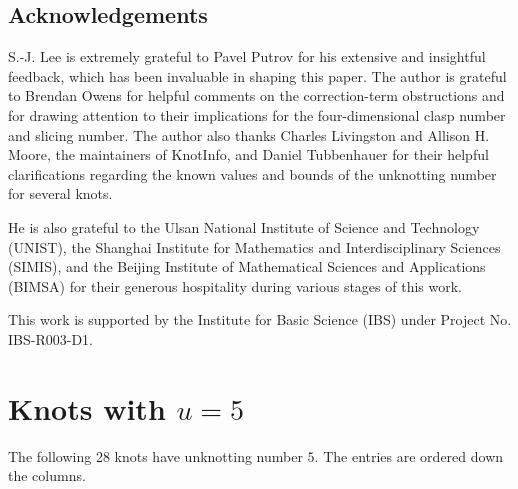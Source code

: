 \documentclass[12pt, oneside]{amsart}
\newcommand{\nUfive}{28}
\begin{document}
\subsection*{Acknowledgements}

S.-J. Lee is extremely grateful to Pavel Putrov for his extensive and insightful feedback, which has been invaluable in shaping this paper.
The author is grateful to Brendan Owens for helpful comments on the correction-term
obstructions and for drawing attention to their implications for the four-dimensional
clasp number and slicing number.
The author also thanks Charles Livingston and Allison H. Moore, the maintainers of KnotInfo, and Daniel Tubbenhauer for their helpful clarifications regarding the known values and bounds of the unknotting number for several knots.

He is also grateful to the Ulsan National Institute of Science and Technology (UNIST), the Shanghai Institute for Mathematics and Interdisciplinary Sciences (SIMIS), and the Beijing Institute of Mathematical Sciences and Applications (BIMSA) for their generous hospitality during various stages of this work. 

This work is supported by the Institute for Basic Science (IBS) under Project No. IBS-R003-D1.


\clearpage
\flushbottom
\appendix

\newsavebox{\appendixLegendBox}

\section{Knots with \texorpdfstring{$u=5$}{u=5}}\label{app:u5}
The following \nUfive{} knots have unknotting number $5$.  The entries are ordered down the
columns.
\end{document}
